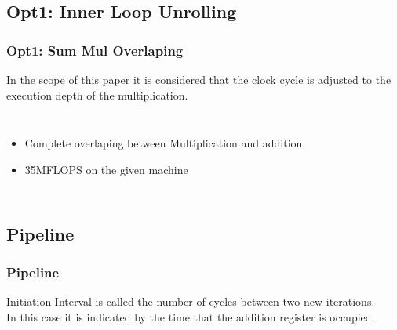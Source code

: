 \documentclass{beamer}
\begin{document}
\begin{frame}
\subsection{Opt1: Inner Loop Unrolling}
\frametitle{Opt1: Sum Mul Overlaping}

In the scope of this paper it is considered that the clock cycle is adjusted to the execution depth of the multiplication.

\begin{columns}[c]


\begin{itemize}
\item Complete overlaping between Multiplication and addition
\item 35MFLOPS on the given machine
\end{itemize}

\end{columns}
\end{frame}
\begin{frame}
\subsection{Pipeline}
\frametitle{Pipeline}
\alert{Initiation Interval} is called the number of cycles between two new iterations.\\
In this case it is indicated by the time that the addition register is occupied.
\end{frame}
\begin{frame}
\subsection{}
\frametitle{}

\end{frame}
\end{document}
